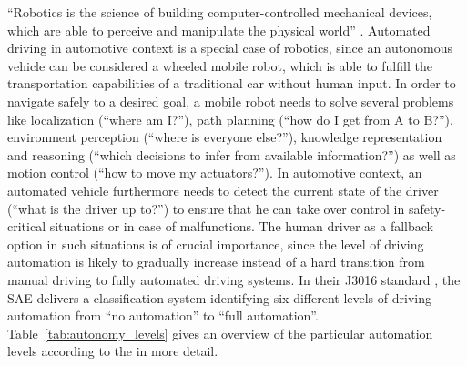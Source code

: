 \enquote{Robotics is the science of building computer-controlled mechanical devices, which are able to perceive and manipulate the physical world} \parencite{Thrun2005}.
Automated driving in automotive context is a special case of robotics, since an autonomous vehicle can be considered a wheeled mobile robot, which is able to fulfill the transportation capabilities of a traditional car without human input.
In order to navigate safely to a desired goal, a mobile robot needs to solve several problems like localization (\enquote{where am I?}), path planning (\enquote{how do I get from A to B?}), environment perception (\enquote{where is everyone else?}), knowledge representation and reasoning (\enquote{which decisions to infer from available information?}) as well as motion control (\enquote{how to move my actuators?}).
In automotive context, an automated vehicle furthermore needs to detect the current state of the driver (\enquote{what is the driver up to?}) to ensure that he can take over control in safety-critical situations or in case of malfunctions.
The human driver as a fallback option in such situations is of crucial importance, since the level of driving automation is likely to gradually increase instead of a hard transition from manual driving to fully automated driving systems.
In their J3016 standard , the \ac{SAE} delivers a classification system identifying six different levels of driving automation from \enquote{no automation} to \enquote{full automation}.
Table~\ref{tab:autonomy_levels} gives an overview of the particular automation levels according to the \textcite{SAE_J3016} in more detail.

